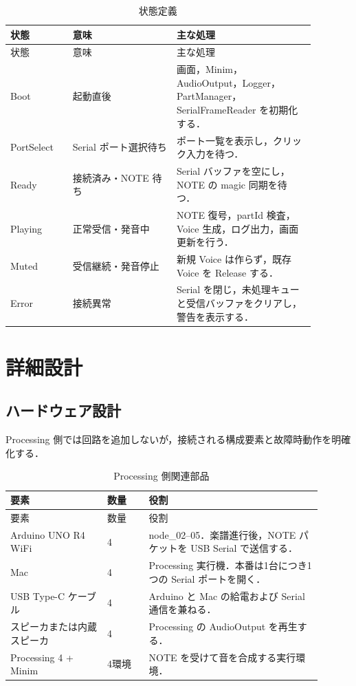 \documentclass[lualatex,book,openany,paper=a4paper,jafontsize=11.5pt,jafontscale=1.05]{jlreq}
\begin{document}
\begin{longtable}{p{0.18\linewidth}p{0.30\linewidth}p{0.40\linewidth}}
\caption{状態定義}\label{tab:states}\\
\toprule
状態 & 意味 & 主な処理 \\
\midrule
\endfirsthead
\toprule
状態 & 意味 & 主な処理 \\
\midrule
\endhead
Boot & 起動直後 & 画面，Minim，AudioOutput，Logger，PartManager，SerialFrameReader を初期化する． \\
PortSelect & Serial ポート選択待ち & ポート一覧を表示し，クリック入力を待つ． \\
Ready & 接続済み・NOTE 待ち & Serial バッファを空にし，NOTE の magic 同期を待つ． \\
Playing & 正常受信・発音中 & NOTE 復号，partId 検査，Voice 生成，ログ出力，画面更新を行う． \\
Muted & 受信継続・発音停止 & 新規 Voice は作らず，既存 Voice を Release する． \\
Error & 接続異常 & Serial を閉じ，未処理キューと受信バッファをクリアし，警告を表示する． \\
\bottomrule
\end{longtable}

\chapter{詳細設計}

\section{ハードウェア設計}
Processing 側では回路を追加しないが，接続される構成要素と故障時動作を明確化する．

\begin{longtable}{p{0.28\linewidth}p{0.12\linewidth}p{0.50\linewidth}}
\caption{Processing 側関連部品}\label{tab:parts}\\
\toprule
要素 & 数量 & 役割 \\
\midrule
\endfirsthead
\toprule
要素 & 数量 & 役割 \\
\midrule
\endhead
Arduino UNO R4 WiFi & 4 & node\_02--05．楽譜進行後，NOTE パケットを USB Serial で送信する． \\
Mac & 4 & Processing 実行機．本番は1台につき1つの Serial ポートを開く． \\
USB Type-C ケーブル & 4 & Arduino と Mac の給電および Serial 通信を兼ねる． \\
スピーカまたは内蔵スピーカ & 4 & Processing の AudioOutput を再生する． \\
Processing 4 + Minim & 4環境 & NOTE を受けて音を合成する実行環境． \\
\bottomrule
\end{longtable}
\end{document}
